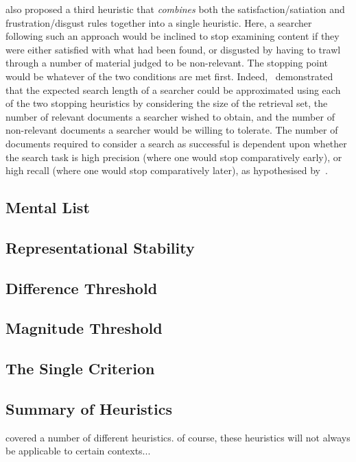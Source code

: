\cite{kraft1979stopping_rules} also proposed a third heuristic that \emph{combines} both the satisfaction/satiation and frustration/disgust rules together into a single heuristic. Here, a searcher following such an approach would be inclined to stop examining content if they were either satisfied with what had been found, or disgusted by having to trawl through a number of material judged to be non-relevant. The stopping point would be whatever of the two conditions are met first. Indeed,~\cite{kraft1979stopping_rules} demonstrated that the expected search length of a searcher could be approximated using each of the two stopping heuristics by considering the size of the retrieval set, the number of relevant documents a searcher wished to obtain, and the number of non-relevant documents a searcher would be willing to tolerate. The number of documents required to consider a search as successful is dependent upon whether the search task is high precision (where one would stop comparatively early), or high recall (where one would stop comparatively later), as hypothesised by~\cite{bates1984thirty_items}.

\subsection{Mental List}

\subsection{Representational Stability}

\subsection{Difference Threshold}

\subsection{Magnitude Threshold}

\subsection{The Single Criterion}

\subsection{Summary of Heuristics}
covered a number of different heuristics.
of course, these heuristics will not always be applicable to certain contexts...

